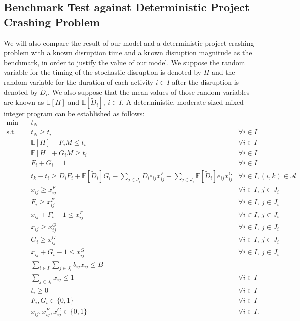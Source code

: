 \documentclass[11pt]{article}
\newcommand{\E}{{\mathbb E}}
\begin{document}
	\subsection{Benchmark Test against Deterministic Project Crashing Problem}
		We will also compare the result of our model and a deterministic project crashing problem with a known disruption time and a known disruption magnitude as the benchmark, in order to justify the value of our model. We suppose the random variable for the timing of the stochastic disruption is denoted by \(H\) and the random variable for the duration of each activity \(i \in I\) after the disruption is denoted by \(\tilde{D}_i\). We also suppose that the mean values of those random variables are known as \(\E[H]\) and \(\E[\tilde{D}_i],\ i \in I\). A deterministic, moderate-sized mixed integer program can be established as follows: 
		\begin{subequations}
			\label{prob:dextensive}
			\begin{align}
			\min \quad & t_N &\\
			\text{s.t.} \quad & t_N \geq t_i & \forall i \in I \label{cons:dtN}\\
			& \E[H] - F_i M \leq t_i & \forall i \in I \label{cons:dFt}\\
			& \E[H] + G_i M \geq t_i & \forall i \in I \label{cons:dGt}\\
			& F_i + G_i = 1 & \forall i \in I \label{cons:dFG}\\
			& t_k - t_i \geq D_i F_i + \E[\tilde{D}_i] G_i - \sum_{j \in J_i} D_i e_{ij} x^F_{ij} - \sum_{j \in J_i} \E[\tilde{D}_i] e_{ij} x^G_{ij} & \forall i \in I, (i,k) \in \mathcal{A} \label{cons:dtt}\\
			& x_{ij} \geq x_{ij}^F & \forall i \in I,\ j \in J_i \label{cons:dxF1}\\
			& F_i \geq x_{ij}^F & \forall i \in I,\ j \in J_i \label{cons:dxF2}\\
			& x_{ij} + F_i - 1 \leq x_{ij}^F & \forall i \in I, \ j \in J_i \label{cons:dxF3}\\
			& x_{ij} \geq x_{ij}^G & \forall i \in I,\ j \in J_i \label{cons:dxG1}\\
			& G_i \geq x_{ij}^G & \forall i \in I,\ j \in J_i \label{cons:dxG2}\\
			& x_{ij} + G_i - 1 \leq x_{ij}^G & \forall i \in I, \ j \in J_i \label{cons:dxG3}\\
			& \sum_{i \in I} \sum_{j \in J_i} b_{ij} x_{ij} \leq B & \label{cons:dBudget}\\
			& \sum_{j \in J_i} x_{ij}\leq 1 & \forall i \in I \label{cons:dOneCrash}\\ 
			& t_i \geq 0 & \forall i \in I\\
			& F_i, G_i \in \{0,1\} & \forall i \in I \\
			& x_{ij}, x_{ij}^F, x_{ij}^G \in \{0,1\} & \forall i \in I.
			\end{align}
		\end{subequations}
\end{document}
